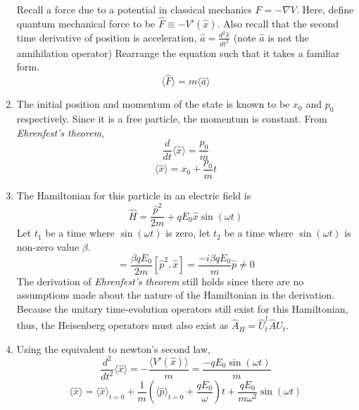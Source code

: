 \begin{sol}
\begin{enumerate}[label=\textbf{(\alph*)}]
Recall a force due to a potential in classical mechanics $F=-\nabla V$. Here, define quantum mechanical force to be $\hat F\equiv-V'(\hat x)$. Also recall that the second time derivative of position is acceleration, $\hat a=\frac{d^2\hat x}{dt^2}$  (note $\hat a$ is not the annihilation operator) Rearrange the equation such that it takes a familiar form.
\begin{equation}
	\langle\hat F\rangle=m\langle\hat a\rangle
\end{equation} 
\item
The initial position and momentum of the state is known to be $x_0$ and $p_0$ respectively. Since it is a free particle, the momentum is constant. From \textit{Ehrenfest's theorem}, 
\begin{equation}
	\frac{d}{dt}\langle\hat x\rangle=\frac{p_0}{m}
\end{equation}
\begin{equation}
	\langle\hat x\rangle=x_0+\frac{p_0}{m}t
\end{equation} 
\item
The Hamiltonian for this particle in an electric field is
\begin{equation}
	\hat H=\frac{\hat p^2}{2m}+qE_0\hat x\sin(\omega t)
\end{equation}
Let $t_1$ be a time where $\sin(\omega t)$ is zero, let $t_2$ be a time where $\sin(\omega t)$ is non-zero value $\beta$.
\begin{equation}
	[\hat H(t_1),\hat H(t_2)]=\frac{\beta qE_0}{2m}[\hat p^2,\hat x]=\frac{-i\beta qE_0}{m}\hat p\neq 0
\end{equation} 
The derivation of \textit{Ehrenfest's theorem} still holds since there are no assumptions made about the nature of the Hamiltonian in the derivation. Because the unitary time-evolution operators still exist for this Hamiltonian, thus, the Heisenberg operators must also exist as $\hat A_H=\hat U_t^\dagger\hat A\hat U_t$.
\item
Using the equivalent to newton's second law, 
\begin{equation}
	\frac{d^2}{dt^2}\langle\hat x\rangle=-\frac{\langle V'(\hat x)\rangle}{m}=\frac{-qE_0\sin(\omega t)}{m}
\end{equation}
\begin{equation}
	\langle\hat x\rangle=\langle\hat x\rangle_{t=0}+\frac{1}{m}\left(\langle\hat p\rangle_{t=0}+\frac{qE_0}{\omega}\right)t+\frac{qE_0}{m\omega^2}\sin(\omega t)
\end{equation}
\end{enumerate}
\end{sol}
